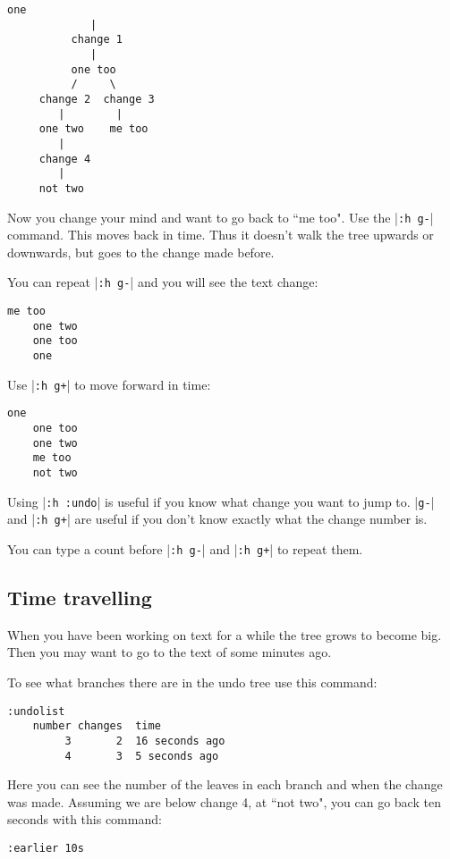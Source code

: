 \begin{Verbatim}[samepage=true]
            one 
             |
          change 1
             |
          one too 
          /     \
     change 2  change 3
        |        |
     one two    me too 
        |
     change 4
        |
     not two 
\end{Verbatim}

Now you change your mind and want to go back to ``me too".
Use the |\texttt{:h g-}| command.
This moves back in time.
Thus it doesn't walk the tree upwards or downwards, but goes to the change made before.

You can repeat |\texttt{:h g-}| and you will see the text change:

\begin{Verbatim}[samepage=true]
    me too 
    one two 
    one too 
    one 
\end{Verbatim}

Use |\texttt{:h g+}| to move forward in time:

\begin{Verbatim}[samepage=true]
    one 
    one too 
    one two 
    me too 
    not two 
\end{Verbatim}

Using |\texttt{:h :undo}| is useful if you know what change you want to jump to.
|\texttt{g-}| and |\texttt{:h g+}| are useful if you don't know exactly what the change number is.

You can type a count before |\texttt{:h g-}| and |\texttt{:h g+}| to repeat them.
\subsection{Time travelling}
When you have been working on text for a while the tree grows to become big.
Then you may want to go to the text of some minutes ago.

To see what branches there are in the undo tree use this command:

\begin{Verbatim}[samepage=true]
 :undolist
    number changes  time 
         3       2  16 seconds ago
         4       3  5 seconds ago
\end{Verbatim}

Here you can see the number of the leaves in each branch and when the change was made.
Assuming we are below change 4, at ``not two", you can go back ten seconds with this command:

\begin{Verbatim}[samepage=true]
 :earlier 10s
\end{Verbatim}

